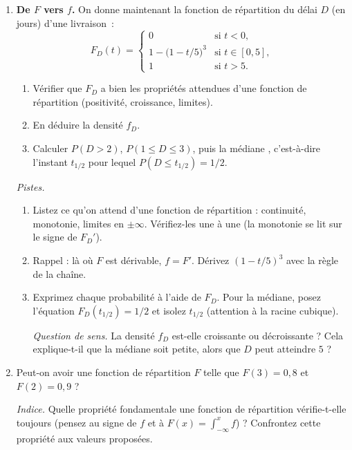 \begin{enumerate}
  \item \textbf{De $F$ vers $f$.}
  On donne maintenant la fonction de répartition
  du délai $D$ (en jours) d'une livraison~:
  \[
    F_D(t)=
    \begin{cases}
      0 & \text{si } t<0,\\
      1-\bigl(1-t/5\bigr)^3 & \text{si } t\in[0,5],\\
      1 & \text{si } t>5.
    \end{cases}
  \]
  \begin{enumerate}
    \item Vérifier que $F_D$ a bien les propriétés attendues
    d'une fonction de répartition (positivité, croissance, limites).
    \item En déduire la densité $f_D$.
    \item Calculer $P(D>2)$, $P(1\le D\le 3)$,
    puis la \og médiane \fg, c'est-à-dire l'instant $t_{1/2}$ pour lequel
    $P(D\le t_{1/2})=1/2$.
  \end{enumerate}
  \begin{solution}
    \textit{Pistes.}
    \begin{enumerate}
    \item Listez ce qu'on attend d'une fonction de répartition :
    continuité, monotonie, limites en $\pm\infty$. Vérifiez-les
    une à une (la monotonie se lit sur le signe de $F_D'$).
    \item Rappel : là où $F$ est dérivable, $f=F'$. Dérivez
    $(1-t/5)^3$ avec la règle de la chaîne.
    \item Exprimez chaque probabilité à l'aide de $F_D$.
    Pour la médiane, posez l'équation $F_D(t_{1/2})=1/2$ et
    isolez $t_{1/2}$ (attention à la racine cubique).

    \textit{Question de sens.} La densité $f_D$ est-elle
    croissante ou décroissante ? Cela explique-t-il que la médiane
    soit petite, alors que $D$ peut atteindre $5$ ?
    \end{enumerate}
  \end{solution}

  \item 
  Peut-on avoir une fonction de répartition $F$ telle que $F(3)=0{,}8$
  et $F(2)=0{,}9$ ?
  \begin{solution}
    \textit{Indice.} Quelle propriété fondamentale une fonction de
    répartition vérifie-t-elle toujours (pensez au signe de $f$ et
    à $F(x)=\int_{-\infty}^x f$) ? Confrontez cette propriété aux
    valeurs proposées.
  \end{solution}
\end{enumerate}

